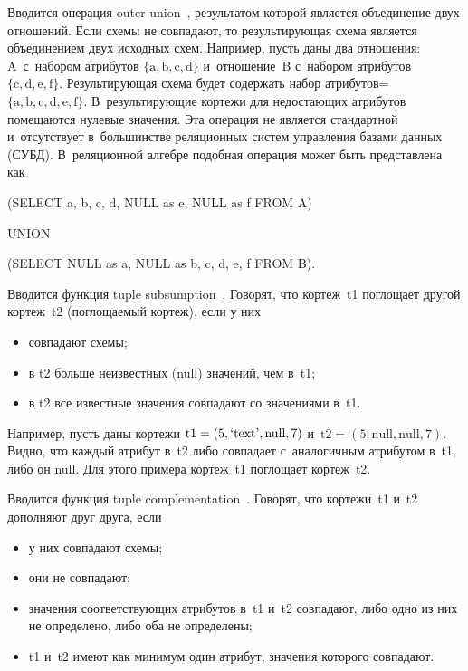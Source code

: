 \begin{multicols}{2}
  Вводится операция {\sf outer union}~\cite{11-vov}, результатом которой
является объединение двух отношений. Если схемы не совпадают, то результирующая схема
является объединением двух исходных схем. Например, пусть даны два отношения:
A~с~набором атрибутов $\{\mathrm{a, b, c, d}\}$ и~отношение~B с~набором атрибутов
$\{\mathrm{c, d, e, f}\}$. Результирующая схема будет содержать набор
атрибутов\;=\;$\{\mathrm{a, b, c, d, e, f}\}$. В~результирующие кортежи для недостающих
атрибутов помещаются нулевые значения. Эта операция не является стандартной
и~отсутствует в~большинстве реляционных систем управления базами данных (СУБД).
В~реляционной алгебре подобная
операция может быть представлена как

\smallskip

  \noindent
  ({\sf  SELECT a, b, c, d, NULL as e, NULL as f FROM A})

\noindent
  {\sf UNION}

\noindent
  ({\sf SELECT NULL as a, NULL as b, c, d, e, f FROM B}).

  Вводится функция {\sf tuple subsumption}~\cite{11-vov}. Говорят, что
кортеж~t1 поглощает другой кортеж~t2 (поглощаемый кортеж), если у них
  \begin{itemize}
\item совпадают схемы;
\item в t2 больше неизвестных (null) значений, чем в~t1;
\item в t2 все известные значения совпадают со значениями в~t1.
\end{itemize}

  Например, пусть даны кортежи $\mathrm{t1} \hm= (5, \mbox{`text'}, \mbox{null}, 7)$
и~$\mathrm{t2} = (5, \mathrm{null}, \mathrm{null}, 7)$. Видно, что каждый атрибут в~t2 либо
совпадает с~аналогичным атрибутом в~t1, либо он null. Для этого примера кортеж~t1
поглощает кортеж~t2.

  Вводится функция {\sf tuple complementation}~\cite{11-vov}. Говорят, что
кортежи~t1 и~t2 дополняют друг друга, если
  \begin{itemize}
\item у них совпадают схемы;
\item они не совпадают;
\item значения соответствующих атрибутов в~t1 и~t2 совпадают, либо одно из них не
определено, либо оба не определены;
\item t1 и~t2 имеют как минимум один атрибут, значения которого совпадают.
\end{itemize}


\end{multicols}
